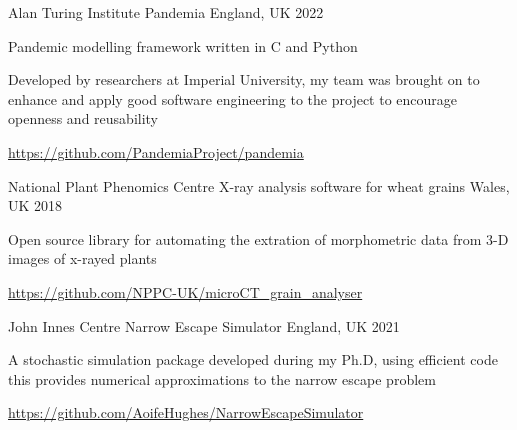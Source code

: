 

\begin{cventries}

  \cventry
    {Alan Turing Institute} %
    {Pandemia} %
    {England, UK} %
    {2022} %
    {
      \begin{cvitems} %
        \item {Pandemic modelling framework written in C and Python}
        \item {Developed by researchers at Imperial University, my team was brought on to enhance and apply good software engineering to the project to encourage openness and reusability}
        \item {\url{https://github.com/PandemiaProject/pandemia}}
      \end{cvitems}
    }

  \cventry
    {National Plant Phenomics Centre} %
    {X-ray analysis software for wheat grains} %
    {Wales, UK} %
    {2018} %
    {
      \begin{cvitems} %
        \item {Open source library for automating the extration of morphometric data from 3-D images of x-rayed plants}
        \item {\url{https://github.com/NPPC-UK/microCT_grain_analyser} }
      \end{cvitems}
    }


  \cventry
    {John Innes Centre} %
    {Narrow Escape Simulator} %
    {England, UK} %
    {2021} %
    {
      \begin{cvitems} %
        \item {A stochastic simulation package developed during my Ph.D, using efficient code this provides numerical approximations to the narrow escape problem}
        \item {\url{https://github.com/AoifeHughes/NarrowEscapeSimulator}}
      \end{cvitems}
    }


\end{cventries}
